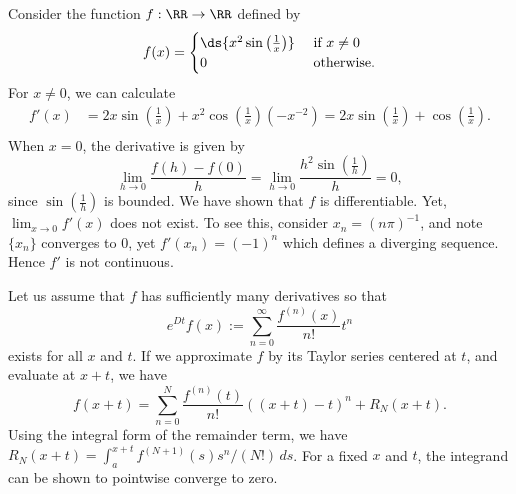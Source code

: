 \documentclass{homework}
\begin{document}
\raggedright

\begin{solution}
  Consider the function $f:\RR \to \RR$ defined by
  $$
    f(x) = \begin{cases}
      \ds{x^2 \sin\left(\frac 1x\right)} & \text{ if } x \not= 0\\
      0 & \text{ otherwise.}
    \end{cases}
  $$
  For $x \not=0$, we can calculate
  \begin{align*}
    f'(x) 
    &= 2x \sin\left(\frac 1x\right) + x^2 \cos\left( \frac 1x\right) (-x^{-2})
    = 2x \sin\left(\frac 1x\right) + \cos\left( \frac 1x\right). \\
  \end{align*}
  When $x = 0$, the derivative is given by
  $$
    \lim_{h\to 0} \frac{ f(h) - f(0) }{h} = \lim_{h\to0} \frac{ h^2\sin\left(\frac 1h\right) }{h} = 0,
  $$
  since $\sin(\frac 1h)$ is bounded.  We have shown that $f$ is differentiable. Yet, $\lim_{x\to0} f'(x)$ does not exist. To see this, consider $x_n = (n\pi)^{-1}$, and note $\{x_n\}$ converges to 0, yet $f'(x_n) = (-1)^{n}$ which defines a diverging sequence. Hence $f'$ is not continuous.
\end{solution}


\begin{solution}
  Let us assume that $f$ has sufficiently many derivatives so that 
  $$
    e^{Dt}f(x) := \sum_{n=0}^\infty \frac{f^{(n)}(x)}{n!} t^n
  $$ 
  exists for all $x$ and $t$.  If we approximate $f$ by its Taylor series centered at $t$, and evaluate at $x+t$, we have
  $$
    f(x+t) = \sum_{n=0}^N \frac{f^{(n)}(t)}{n!} ((x+t) - t)^n + R_N(x+t).
  $$
  Using the integral form of the remainder term, we have $R_N(x+t) = \int_a^{x+t} f^{(N+1)}(s) s^n/(N!)\,ds$.  For a fixed $x$ and $t$, the integrand can be shown to pointwise converge to zero.  
\end{solution}
\end{document}
